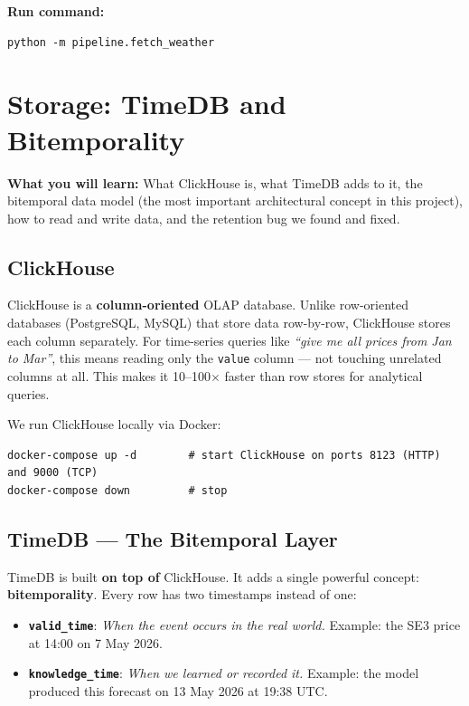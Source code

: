 \documentclass[12pt, a4paper, oneside]{memoir}
\newcommand{\code}[1]{\texttt{\footnotesize #1}}
\begin{document}
\textbf{Run command:}
\begin{verbatim}
python -m pipeline.fetch_weather
\end{verbatim}

\chapter{Storage: TimeDB and Bitemporality}\label{ch:timedb}

\begin{chapterintro}
\sffamily\small\textbf{What you will learn:} What ClickHouse is, what TimeDB adds to
it, the bitemporal data model (the most important architectural concept in this project),
how to read and write data, and the retention bug we found and fixed.
\end{chapterintro}

\section{ClickHouse}

ClickHouse is a \textbf{column-oriented} OLAP database. Unlike row-oriented databases
(PostgreSQL, MySQL) that store data row-by-row, ClickHouse stores each column separately.
For time-series queries like \emph{``give me all prices from Jan to Mar''}, this means
reading only the \code{value} column --- not touching unrelated columns at all.
This makes it 10--100$\times$ faster than row stores for analytical queries.

We run ClickHouse locally via Docker:
\begin{verbatim}
docker-compose up -d        # start ClickHouse on ports 8123 (HTTP) and 9000 (TCP)
docker-compose down         # stop
\end{verbatim}

\section{TimeDB --- The Bitemporal Layer}

TimeDB is built \textbf{on top of} ClickHouse. It adds a single powerful concept:
\textbf{bitemporality}. Every row has two timestamps instead of one:

\begin{keyidea}
\begin{itemize}[noitemsep]
  \item \textbf{\code{valid\_time}}: \emph{When the event occurs in the real world.}
    Example: the SE3 price at 14:00 on 7 May 2026.
  \item \textbf{\code{knowledge\_time}}: \emph{When we learned or recorded it.}
    Example: the model produced this forecast on 13 May 2026 at 19:38 UTC.
\end{itemize}
\end{keyidea}
\end{document}
